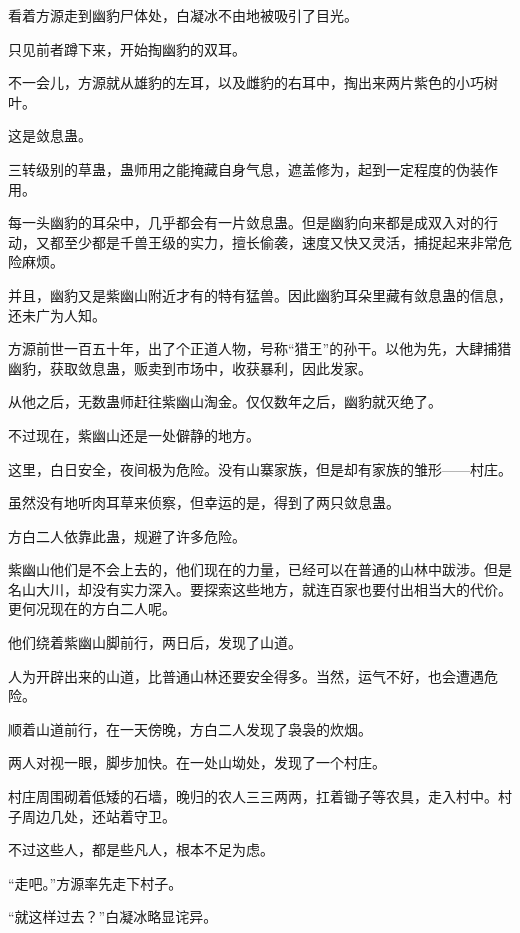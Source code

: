
\begin{this_body}



看着方源走到幽豹尸体处，白凝冰不由地被吸引了目光。

只见前者蹲下来，开始掏幽豹的双耳。

不一会儿，方源就从雄豹的左耳，以及雌豹的右耳中，掏出来两片紫色的小巧树叶。

这是敛息蛊。

三转级别的草蛊，蛊师用之能掩藏自身气息，遮盖修为，起到一定程度的伪装作用。

每一头幽豹的耳朵中，几乎都会有一片敛息蛊。但是幽豹向来都是成双入对的行动，又都至少都是千兽王级的实力，擅长偷袭，速度又快又灵活，捕捉起来非常危险麻烦。

并且，幽豹又是紫幽山附近才有的特有猛兽。因此幽豹耳朵里藏有敛息蛊的信息，还未广为人知。

方源前世一百五十年，出了个正道人物，号称“猎王”的孙干。以他为先，大肆捕猎幽豹，获取敛息蛊，贩卖到市场中，收获暴利，因此发家。

从他之后，无数蛊师赶往紫幽山淘金。仅仅数年之后，幽豹就灭绝了。

不过现在，紫幽山还是一处僻静的地方。

这里，白日安全，夜间极为危险。没有山寨家族，但是却有家族的雏形——村庄。

虽然没有地听肉耳草来侦察，但幸运的是，得到了两只敛息蛊。

方白二人依靠此蛊，规避了许多危险。

紫幽山他们是不会上去的，他们现在的力量，已经可以在普通的山林中跋涉。但是名山大川，却没有实力深入。要探索这些地方，就连百家也要付出相当大的代价。更何况现在的方白二人呢。

他们绕着紫幽山脚前行，两日后，发现了山道。

人为开辟出来的山道，比普通山林还要安全得多。当然，运气不好，也会遭遇危险。

顺着山道前行，在一天傍晚，方白二人发现了袅袅的炊烟。

两人对视一眼，脚步加快。在一处山坳处，发现了一个村庄。

村庄周围砌着低矮的石墙，晚归的农人三三两两，扛着锄子等农具，走入村中。村子周边几处，还站着守卫。

不过这些人，都是些凡人，根本不足为虑。

“走吧。”方源率先走下村子。

“就这样过去？”白凝冰略显诧异。


\end{this_body}
